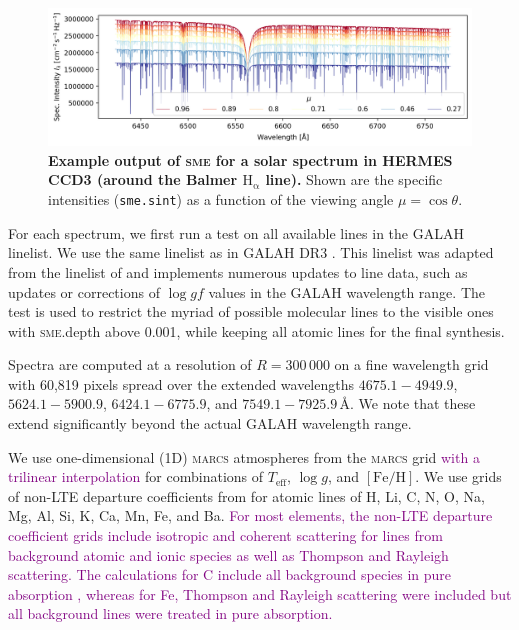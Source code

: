 \documentclass[
  journal=pasa,
  manuscript=research-paper, %
  year=2024,
  volume=37
]{cup-journal}
\newcommand{\adjusted}[1]{{\textcolor{purple}{#1}}}
\newcommand{\Teff}{$T_\mathrm{eff}$\xspace}
\newcommand{\logg}{$\log g$\xspace}
\newcommand{\feh}{$\mathrm{[Fe/H]}$\xspace}
\newcommand{\sme}{\textsc{sme}\xspace}
\newcommand{\marcs}{\textsc{marcs}\xspace}
\newcommand{\Angstroem}{\,\text{\AA}}	%
\begin{document}
\begin{figure}[ht]
 \centering
 \includegraphics[width=\textwidth]{figures/solar_twin_specific_intensity.png}
 \caption{\textbf{Example output of \sme for a solar spectrum in HERMES CCD3 (around the Balmer $\mathrm{H}_\upalpha$ line).} Shown are the specific intensities (\texttt{sme.sint}) as a function of the viewing angle $\mu = \cos \theta$. }
 \label{fig:sme_mu_output}
\end{figure}

For each spectrum, we first run a test on all available lines in the GALAH linelist. We use the same linelist as in GALAH DR3 \citep{Buder2021}. This linelist was adapted from the linelist of \citet{Heiter2021} and implements numerous updates to line data, such as updates or corrections of $\log gf$ values in the GALAH wavelength range. The test is used to restrict the myriad of possible molecular lines to the visible ones with \textsc{sme}.depth above 0.001, while keeping all atomic lines for the final synthesis.

Spectra are computed at a resolution of $R = 300\,000$ on a fine wavelength grid with 60,819 pixels spread over the extended wavelengths $4675.1-4949.9$, $5624.1-5900.9$, $6424.1-6775.9$, and $7549.1-7925.9 \Angstroem$. We note that these extend significantly beyond the actual GALAH wavelength range.

We use one-dimensional (1D) \marcs atmospheres from the \marcs grid \citep[][version 2014]{Gustafsson2008} \adjusted{with a trilinear interpolation} for combinations of \Teff, \logg, and \feh. We use grids of non-LTE departure coefficients from \citet{Amarsi2020, Amarsi2022} for atomic lines of H, Li, C, N, O, Na, Mg, Al, Si, K, Ca, Mn, Fe, and Ba. \adjusted{For most elements, the non-LTE departure coefficient grids include isotropic and coherent scattering for lines from background atomic and ionic species \citep[see Equation 7 of ][]{Amarsi2020} as well as Thompson and Rayleigh scattering. The calculations for C include all background species in pure absorption \citep[Equation 6 of ][]{Amarsi2020}, whereas for Fe, Thompson and Rayleigh scattering were included but all background lines were treated in pure absorption.}
\end{document}
